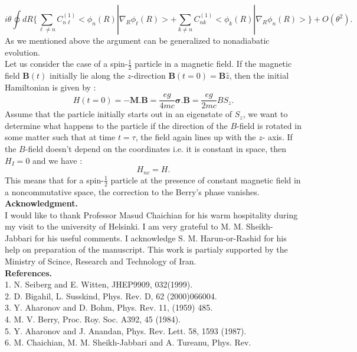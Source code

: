 \documentclass[a4paper,a4paper]{article}
\begin{document}
\begin{equation}
i\theta\oint dR\{\sum_{\ell\neq
n}C^{(1)}_{n\ell}<\phi_{n}(R)|
\nabla_{R}\phi_{\ell}(R)>+\sum_{k\neq
n}C^{(1)}_{nk}<\phi_{k}(R)|
\nabla_{R}\phi_{n}(R)>\}+O(\theta^{2}) .
\end{equation}
As we mentioned above the argument can be generalized to nonadiabatic
evolution.\\
Let us consider the case of a spin-$\frac{1}{2}$ particle in a
magnetic field. If the magnetic field $\mathbf{B}(t)$ initially
lie along the $z$-direction $ \mathbf{B}(t=0)=\mathbf{B}\hat{z}$,
then the initial Hamiltonian is given by :
\begin{equation}
H(t=0)=-\mathbf{M}\mathbf{.}
\mathbf{B}=\frac{eg}{4mc}\mathbf{\sigma}\mathbf{.}
\mathbf{B}=\frac{eg}{2mc}B S_{z} .
\end{equation}
Assume that the particle initially starts out in an eigenstate of
$S_{z}$, we want to  determine what happens to the particle if the
direction of the $B$-field is rotated in some matter such that at
time $t=\tau$, the field again lines up with the $z$- axis. If the
$B$-field doesn't depend on the coordinates i.e. it is constant in
space, then $H_{I}=0$ and we have :
\begin{equation}
H_{nc}=H .
\end{equation}
This means that for a spin-$\frac{1}{2}$ particle at the presence
of constant magnetic field in a noncommutative space, the
correction to the Berry's phase vanishes.\\
\textbf{Acknowledgment.}\\
I would like to thank Professor Masud Chaichian for his warm
hospitality during my visit to the university of Helsinki. I am very
grateful to M. M. Sheikh- Jabbari for his useful comments. I acknowledge
S. M. Harun-or-Rashid for his help on preparation of the manuscript.
This work is partialy supported by
the Ministry of Scince, Research and Technology of Iran.\\
\textbf{References.}\\
1. N. Seiberg and E. Witten, JHEP9909, 032(1999). \\
2. D. Bigahil, L. Susskind, Phys. Rev. D, 62 (2000)066004. \\
3. Y. Aharonov and D. Bohm, Phys. Rev. 11, (1959) 485.\\
4. M. V. Berry, Proc. Roy. Soc. A392, 45 (1984).\\
5. Y. Aharonov and J. Anandan, Phys. Rev. Lett. 58, 1593 (1987).\\
6. M. Chaichian, M. M. Sheikh-Jabbari and A. Tureanu, Phys. Rev.
\end{document}
